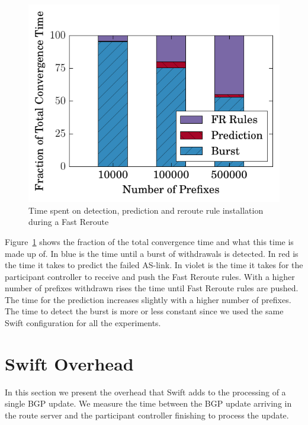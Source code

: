 \begin{figure}[h]
\center
\includegraphics[scale = 1]{Figures/barplot.pdf}
\caption{Time spent on detection, prediction and reroute rule installation during a Fast Reroute}
\label{fig:activities}
\end{figure}

Figure~\ref{fig:activities} shows the fraction of the total convergence time and what this time is made up of. In blue is the time until a burst of withdrawals is detected. In red is the time it takes to predict the failed AS-link. In violet is the time it takes for the participant controller to receive and push the Fast Reroute rules. With a higher number of prefixes withdrawn rises the time until Fast Reroute rules are pushed. The time for the prediction increases slightly with a higher number of prefixes. The time to detect the burst is more or less constant since we used the same Swift configuration for all the experiments. 

\section{\label{chapter4:Swift overhead}Swift Overhead}

In this section we present the overhead that Swift adds to the processing of a single BGP update. We measure the time between the BGP update arriving in the route server and the participant controller finishing to process the update. 

